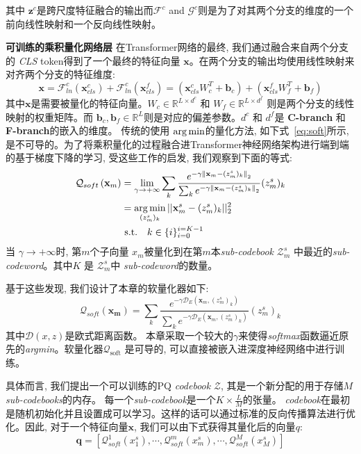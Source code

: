 其中 $\mathbf{z}^c$是跨尺度特征融合的输出而$\mathcal{F}^c$ and $\mathcal{G}^c$则是为了对其两个分支的维度的一个前向线性映射和一个反向线性映射。\par
\textbf{可训练的乘积量化网络层}
在Transformer网络的最终, 我们通过融合来自两个分支的 \textit{CLS} token得到了一个最终的特征向量 $\mathbf{x}$。在两个分支的输出均使用线性映射来对齐两个分支的特征维度:
\begin{equation}
    \mathbf{x} = \mathcal{F}_{ln}^c(\mathbf{x}^c_{cls}) + \mathcal{F}_{ln}^c(\mathbf{x}^f_{cls}) = (\mathbf{x}^c_{cls} W_c^T + \mathbf{b}_c) + ( \mathbf{x}^f_{cls} W_f^T + \mathbf{b}_f)
\end{equation}
其中$ \mathbf{x}$是需要被量化的特征向量。$W_c \in \mathbb{R}^{L \times d^c }$ 和  $W_f \in \mathbb{R}^{L \times d^f}$ 则是两个分支的线性映射的权重矩阵。而 $\mathbf{b}_c, \mathbf{b}_f \in \mathbb{R}^{L}$则是对应的偏差参数。$d^c$ 和 $d^f$是  \textbf{C-branch} 和 \textbf{F-branch}的嵌入的维度。 传统的使用 $\operatorname*{arg\,min}$的量化方法, 如下式~\ref{eq:soft}所示, 是不可导的。为了将乘积量化的过程融合进Transformer神经网络架构进行端到端的基于梯度下降的学习, 受这些工作\cite{arandjelovic2016netvlad,yu2018product}的启发, 我们观察到下面的等式:
\begin{equation}
    \label{eq:soft}
    \begin{aligned}
    \mathcal{Q}_{soft}\left(\mathbf{x}_{m}\right) &=\lim _{\gamma \rightarrow+\infty} \sum_{k} \frac{e^{-\gamma\left\|\mathbf{x}_{m}-(z_m^s)_k\right\|_{2}}}{\sum_{k} e^{-\gamma\left\|\mathbf{x}_{m}-(z_m^s)_k\right\|_{2}}} (z_m^s)_k \\
    & = \operatorname*{arg\,min}_{(z^s_m)_k} ||\mathbf{x}_m^s - (z^s_m)_k ||_2^2  \\
    &\text { s.t.}  \quad k \in  \{i\}_{i=0}^{i=K-1}
    \end{aligned}
\end{equation}
当 $\gamma \rightarrow+\infty$时,  第$m$个子向量 $x_m$被量化到在第$m$本\textit{sub-codebook}  $\mathcal{Z}_m^s$ 中最近的\textit{sub-codeword}。其中$K$ 是 $\mathcal{Z}_m^s$中 \textit{sub-codeword}的数量。\par
基于这些发现, 我们设计了本章的软量化器如下:
\begin{equation}
    \mathcal{Q}_{soft}(\mathbf{x_m}) = \sum_{k} \frac{e^{-\gamma \mathcal{D}_E(\mathbf{x}_{m},(z_m^s)_k)}}{\sum_{k} e^{-\gamma \mathcal{D}_E(\mathbf{x}_{m},(z_m^s)_k)}} (z_m^s)_k 
\end{equation}
其中$\mathcal{D}(x,z)$是欧式距离函数。 本章采取一个较大的$\gamma$来使得\textit{softmax}函数逼近原先的\textit{argmin}。软量化器$\mathcal{Q}_{\text{soft}}$ 是可导的, 可以直接被嵌入进深度神经网络中进行训练。\par
具体而言, 我们提出一个可以训练的{PQ} \textit{codebook} $\mathcal{Z}$, 其是一个新分配的用于存储$M$\textit{sub-codebooks}的内存。 每一个\textit{sub-codebook}是一个$K \times \frac{L}{M}$的张量。 \textit{codebook}在最初是随机初始化并且设置成可以学习。这样的话可以通过标准的反向传播算法进行优化。因此, 对于一个特征向量$\textbf{x}$, 我们可以由下式获得其量化后的向量$q$:
\begin{equation}
    \label{eq:quantizer}
        \textbf{q} = [\mathcal{Q}^1_{soft}(x^s_1),\cdots,\mathcal{Q}^m_{soft}(x^s_m),\cdots,\mathcal{Q}^M_{soft}(x^s_M)]
    \end{equation}
    
